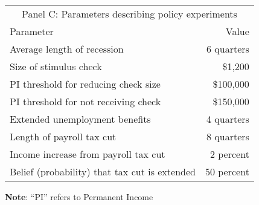 \documentclass[\PathToRoot/\ProjectName]{subfiles}
\begin{document}
\begin{table}[tb]
  \begin{tabular*}
    {\textwidth}{@{\extracolsep{\fill}}lr@{}}
    \multicolumn{2}{c}{\small Panel C: Parameters describing policy experiments} \\
    \addlinespace
    \hline
    Parameter                                        & Value \\ \hline
    Average length of recession                      & 6 quarters \\
    Size of stimulus check                           & \$1,200 \\
    PI threshold for reducing check size             & \$100,000 \\
    PI threshold for not receiving check             & \$150,000 \\
    Extended unemployment benefits                   & 4 quarters \\
    Length of payroll tax cut                        & 8 quarters \\
    Income increase from payroll tax cut             & 2 percent \\
    Belief (probability) that tax cut is extended    & 50 percent \\
    \hline
  \end{tabular*}

  \vspace{0.5em}
  \noindent\parbox{\textwidth}{\footnotesize
    \textbf{Note}: ``PI'' refers to Permanent Income}
  \vspace{0.5em}
\end{table}

\smartbib
\end{document}
